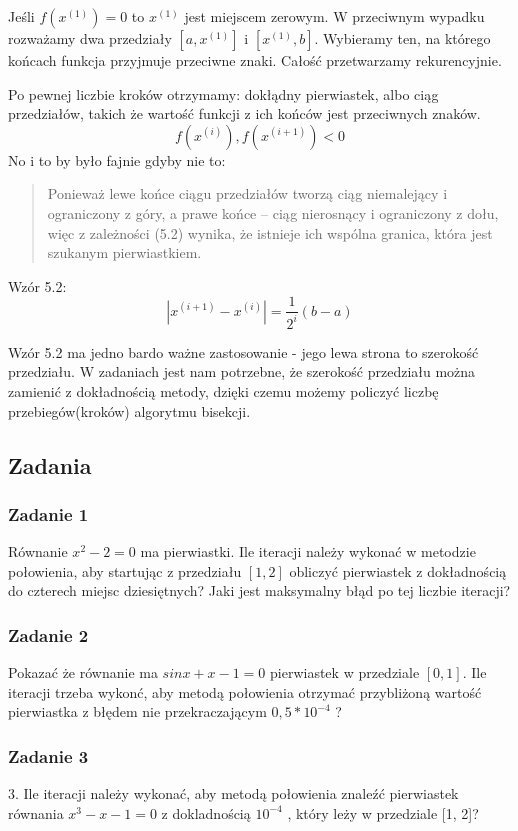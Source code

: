 \documentclass[a4paper]{article}
\begin{document}
Jeśli $f(x^{(1)}) = 0$ to $x^{(1)}$ jest miejscem zerowym. W przeciwnym wypadku rozważamy dwa przedziały $[a,x^{(1)}]$ i $[x^{(1)},b]$. Wybieramy ten, na którego końcach funkcja przyjmuje przeciwne znaki.
Całość przetwarzamy rekurencyjnie.

Po pewnej liczbie kroków otrzymamy: dokłądny pierwiastek, albo ciąg przedziałów, takich że wartość funkcji z ich końców jest przeciwnych znaków.
$$f(x^{(i)}),f(x^{(i+1)})<0$$
No i to by było fajnie gdyby nie to: 
\begin{quote}
    Ponieważ lewe końce ciągu przedziałów tworzą ciąg niemalejący i ograniczony z góry, a prawe końce – ciąg nierosnący i ograniczony z dołu, więc z zależności (5.2) wynika, że istnieje ich wspólna granica, która jest szukanym pierwiastkiem.
\end{quote}
Wzór 5.2: $$|x^{(i+1)} - x^{(i)}| = \frac{1}{2^i}(b-a)$$

Wzór 5.2 ma jedno bardo ważne zastosowanie - jego lewa strona to szerokość przedziału. W zadaniach jest nam potrzebne, że szerokość przedziału można zamienić z dokładnością metody, dzięki czemu możemy policzyć liczbę przebiegów(kroków) algorytmu bisekcji.

\subsection{Zadania}

    \subsubsection*{Zadanie 1} Równanie $x^2 - 2 = 0$ ma pierwiastki. Ile iteracji należy wykonać w metodzie połowienia, aby startując z przedziału $[1, 2]$ obliczyć pierwiastek z dokładnością do czterech miejsc dziesiętnych? Jaki jest maksymalny błąd po tej liczbie iteracji?
    \subsubsection*{Zadanie 2} Pokazać że równanie ma $sin x + x -1 = 0$ pierwiastek w przedziale $[0, 1]$. Ile iteracji trzeba wykonć, aby metodą połowienia otrzymać przybliżoną wartość pierwiastka z błędem nie przekraczającym $0,5 *10^{-4}$ ?
    \subsubsection*{Zadanie 3} 3. Ile iteracji należy wykonać, aby metodą połowienia znaleźć pierwiastek równania $x^3-x-1 = 0$ z dokladnością $10^{-4}$ , który leży w przedziale [1, 2]?
\end{document}
